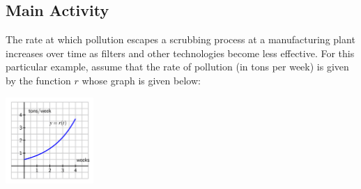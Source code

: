 \documentclass[11pt,letterpaper]{article}
\begin{document}
\subsection*{Main Activity}

The rate at which pollution escapes a scrubbing process at a manufacturing plant increases over time as filters and other technologies become less effective. For this particular example, assume that the rate of pollution (in tons per week) is given by the function $r$ whose graph is given below: 

\begin{center}
	\includegraphics[width=0.25\textwidth]{lab10-plot_preview.png}
\end{center}
\end{document}
